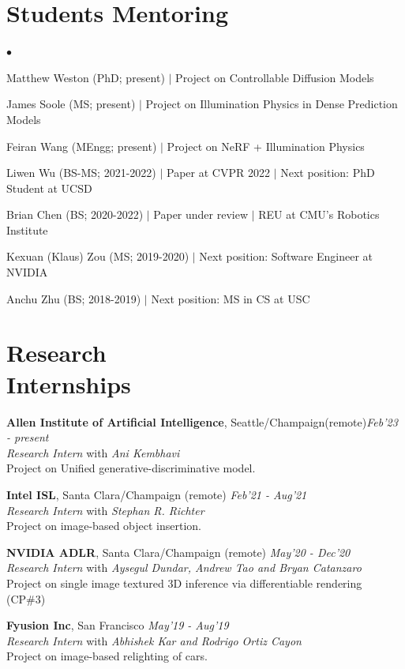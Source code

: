 \documentclass[margin,line]{res}
\newenvironment{list2}{
  \begin{list}{$\bullet$}{%
      \setlength{\itemsep}{0in}
      \setlength{\parsep}{0in} \setlength{\parskip}{0in}
      \setlength{\topsep}{0in} \setlength{\partopsep}{0in} 
      \setlength{\leftmargin}{0.2in}}}{\end{list}}
\begin{document}
\begin{resume}
\section{\sc \large Students Mentoring}
\begin{list2}
\item Matthew Weston (PhD; present) $|$ Project on Controllable Diffusion Models
\item James Soole (MS; present) $|$ Project on Illumination Physics in Dense Prediction Models
\item Feiran Wang (MEngg; present) $|$ Project on NeRF + Illumination Physics
\item Liwen Wu (BS-MS; 2021-2022) $|$ Paper at CVPR 2022 $|$ Next position: PhD Student at UCSD
\item Brian Chen (BS; 2020-2022) $|$  Paper under review $|$ REU at CMU's Robotics Institute
\item Kexuan (Klaus) Zou (MS; 2019-2020) $|$ Next position: Software Engineer at NVIDIA
\item Anchu Zhu (BS; 2018-2019) $|$ Next position: MS in CS at USC 
\end{list2}

\section{\sc \large Research \\ Internships}
{\bf Allen Institute of Artificial Intelligence}, Seattle/Champaign(remote)\hfill  {\em Feb'23 - present}\\
{\em Research Intern}  with {\em Ani Kembhavi}\\
Project on Unified generative-discriminative model.

{\bf Intel ISL}, Santa Clara/Champaign (remote) \hfill  {\em Feb'21 - Aug'21}\\
{\em Research Intern} with {\em Stephan R. Richter}\\
Project on image-based object insertion.

{\bf NVIDIA ADLR}, Santa Clara/Champaign (remote) \hfill  {\em May'20 - Dec'20}\\
{\em Research Intern}  with {\em Aysegul Dundar, Andrew Tao and Bryan Catanzaro}\\
Project on single image textured 3D inference via differentiable rendering (CP\#3)


{\bf Fyusion Inc},  San Francisco \hfill  {\em May'19 - Aug'19}\\
{\em Research Intern}  with {\em Abhishek Kar and Rodrigo Ortiz Cayon}\\
Project on image-based relighting of cars.


\end{resume}
\end{document}
